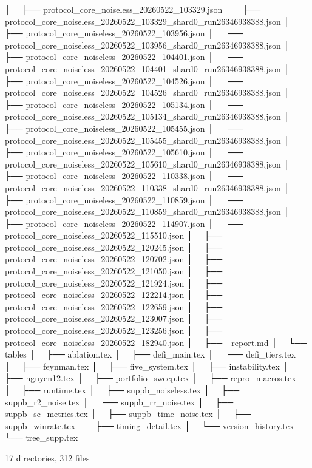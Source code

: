 │           ├── protocol_core_noiseless_20260522_103329.json
│           ├── protocol_core_noiseless_20260522_103329_shard0_run26346938388.json
│           ├── protocol_core_noiseless_20260522_103956.json
│           ├── protocol_core_noiseless_20260522_103956_shard0_run26346938388.json
│           ├── protocol_core_noiseless_20260522_104401.json
│           ├── protocol_core_noiseless_20260522_104401_shard0_run26346938388.json
│           ├── protocol_core_noiseless_20260522_104526.json
│           ├── protocol_core_noiseless_20260522_104526_shard0_run26346938388.json
│           ├── protocol_core_noiseless_20260522_105134.json
│           ├── protocol_core_noiseless_20260522_105134_shard0_run26346938388.json
│           ├── protocol_core_noiseless_20260522_105455.json
│           ├── protocol_core_noiseless_20260522_105455_shard0_run26346938388.json
│           ├── protocol_core_noiseless_20260522_105610.json
│           ├── protocol_core_noiseless_20260522_105610_shard0_run26346938388.json
│           ├── protocol_core_noiseless_20260522_110338.json
│           ├── protocol_core_noiseless_20260522_110338_shard0_run26346938388.json
│           ├── protocol_core_noiseless_20260522_110859.json
│           ├── protocol_core_noiseless_20260522_110859_shard0_run26346938388.json
│           ├── protocol_core_noiseless_20260522_114907.json
│           ├── protocol_core_noiseless_20260522_115510.json
│           ├── protocol_core_noiseless_20260522_120245.json
│           ├── protocol_core_noiseless_20260522_120702.json
│           ├── protocol_core_noiseless_20260522_121050.json
│           ├── protocol_core_noiseless_20260522_121924.json
│           ├── protocol_core_noiseless_20260522_122214.json
│           ├── protocol_core_noiseless_20260522_122659.json
│           ├── protocol_core_noiseless_20260522_123007.json
│           ├── protocol_core_noiseless_20260522_123256.json
│           ├── protocol_core_noiseless_20260522_182940.json
│           ├── _report.md
│           └── tables
│               ├── ablation.tex
│               ├── defi_main.tex
│               ├── defi_tiers.tex
│               ├── feynman.tex
│               ├── five_system.tex
│               ├── instability.tex
│               ├── nguyen12.tex
│               ├── portfolio_sweep.tex
│               ├── repro_macros.tex
│               ├── runtime.tex
│               ├── suppb_noiseless.tex
│               ├── suppb_r2_noise.tex
│               ├── suppb_rr_noise.tex
│               ├── suppb_sc_metrics.tex
│               ├── suppb_time_noise.tex
│               ├── suppb_winrate.tex
│               ├── timing_detail.tex
│               └── version_history.tex
└── tree_supp.tex

17 directories, 312 files
